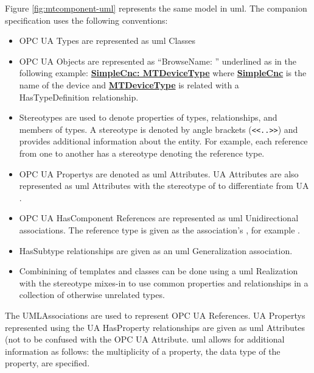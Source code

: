 

Figure \ref{fig:mtcomponent-uml} represents the same model in \gls{uml}. The companion specification uses the following conventions:

\begin{itemize}
  \item OPC UA Types are represented as \gls{uml} Classes
  \item OPC UA Objects are represented as ``\gls{BrowseName}: '' underlined as in the following example: \textbf{\underline{SimpleCnc: MTDeviceType}} where \textbf{\underline{SimpleCnc}} is the name of the device and  \textbf{\underline{MTDeviceType}} is related with a \gls{HasTypeDefinition} relationship.
  \item Stereotypes are used to denote properties of types, relationships, and members of types. A stereotype is denoted by angle brackets (\texttt{<<..>>}) and provides additional information about the entity. For example, each reference from one  to another has a stereotype denoting the reference type.
  \item OPC UA \glspl{Property} are denoted as \gls{uml} Attributes. UA \glspl{Attribute} are also represented as \gls{uml} Attributes with the stereotype of  to differentiate from UA .
  \item OPC UA \gls{HasComponent} \glspl{Reference} are represented as \gls{uml} Unidirectional associations. The reference type is given as the association's , for example . 
  \item \gls{HasSubtype} relationships are given as an \gls{uml} Generalization association.
  \item Combinining of templates and classes can be done using a \gls{uml} \gls{Realization} with the stereotype \gls{mixes-in} to use common properties and relationships in a collection of otherwise unrelated types.
\end{itemize}

The \glspl{UMLAssociation} are used to represent OPC UA \glspl{Reference}. UA \glspl{Property} represented using the UA \gls{HasProperty} relationships are given as \gls{uml} \glspl{Attribute} (not to be confused with the OPC UA \gls{Attribute}. \gls{uml} allows for additional information as follows: the multiplicity of a property, the data type of the property, are specified.


\FloatBarrier


